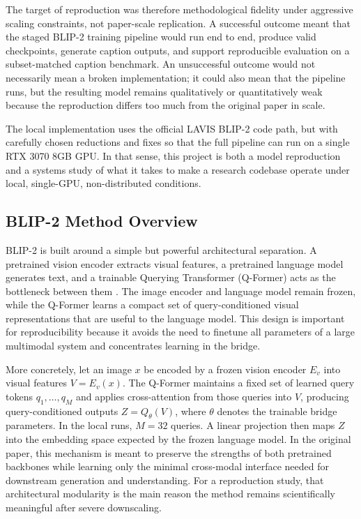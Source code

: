 \documentclass[11pt]{article}
\begin{document}
The target of reproduction was therefore methodological fidelity under aggressive scaling constraints, not paper-scale replication. A successful outcome meant that the staged BLIP-2 training pipeline would run end to end, produce valid checkpoints, generate caption outputs, and support reproducible evaluation on a subset-matched caption benchmark. An unsuccessful outcome would not necessarily mean a broken implementation; it could also mean that the pipeline runs, but the resulting model remains qualitatively or quantitatively weak because the reproduction differs too much from the original paper in scale.

The local implementation uses the official LAVIS BLIP-2 code path, but with carefully chosen reductions and fixes so that the full pipeline can run on a single RTX 3070 8GB GPU. In that sense, this project is both a model reproduction and a systems study of what it takes to make a research codebase operate under local, single-GPU, non-distributed conditions.

\subsection{BLIP-2 Method Overview}
BLIP-2 is built around a simple but powerful architectural separation. A pretrained vision encoder extracts visual features, a pretrained language model generates text, and a trainable Querying Transformer (Q-Former) acts as the bottleneck between them \citep{li2023blip2}. The image encoder and language model remain frozen, while the Q-Former learns a compact set of query-conditioned visual representations that are useful to the language model. This design is important for reproducibility because it avoids the need to finetune all parameters of a large multimodal system and concentrates learning in the bridge.

More concretely, let an image $x$ be encoded by a frozen vision encoder $E_v$ into visual features $V = E_v(x)$. The Q-Former maintains a fixed set of learned query tokens $q_1, \dots, q_M$ and applies cross-attention from those queries into $V$, producing query-conditioned outputs $Z = Q_\theta(V)$, where $\theta$ denotes the trainable bridge parameters. In the local runs, $M = 32$ queries. A linear projection then maps $Z$ into the embedding space expected by the frozen language model. In the original paper, this mechanism is meant to preserve the strengths of both pretrained backbones while learning only the minimal cross-modal interface needed for downstream generation and understanding. For a reproduction study, that architectural modularity is the main reason the method remains scientifically meaningful after severe downscaling.
\end{document}
